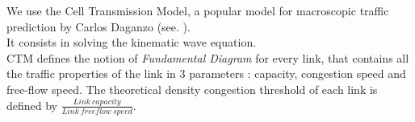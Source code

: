 We use the Cell Transmission Model, a popular model for macroscopic traffic prediction by Carlos Daganzo (see. \cite{ctm}).\\
It consists in solving the kinematic wave equation.\\
CTM defines the notion of \emph{Fundamental Diagram} for every link, that contains all the traffic properties of the link in 3 parameters : capacity, congestion speed and free-flow speed.
The theoretical density congestion threshold of each link is defined by $\frac{Link\ capacity}{Link\ freeflow\ speed}$.